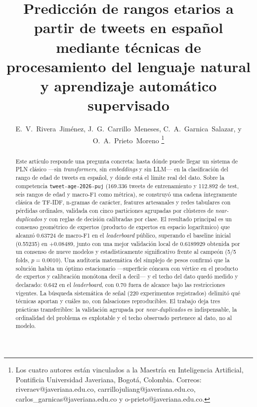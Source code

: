 \documentclass[journal]{IEEEtai}
\begin{document}
\title{Predicci\'on de rangos etarios a partir de tweets en espa\~nol mediante t\'ecnicas de procesamiento del lenguaje natural y aprendizaje autom\'atico supervisado}

\author{E.~V.~Rivera~Jim\'enez, J.~G.~Carrillo~Meneses, C.~A.~Garnica~Salazar, y O.~A.~Prieto~Moreno%
\thanks{Los cuatro autores est\'an vinculados a la Maestr\'ia en Inteligencia Artificial, Pontificia Universidad Javeriana, Bogot\'a, Colombia. Correos: riveraev@javeriana.edu.co, carrillojuliang@javeriana.edu.co, carlos\_garnicas@javeriana.edu.co y o-prieto@javeriana.edu.co.}}


\maketitle

\begin{abstract}
Este art\'iculo responde una pregunta concreta: hasta d\'onde puede llegar un sistema de PLN cl\'asico ---sin \textit{transformers}, sin \textit{embeddings} y sin LLM--- en la clasificaci\'on del rango de edad de tweets en espa\~nol, y d\'onde est\'a el l\'imite real del dato. Sobre la competencia \texttt{tweet-age-2026-puj} (169.336 tweets de entrenamiento y 112.892 de test, seis rangos de edad y macro-F1 como m\'etrica), se construy\'o una cadena \'integramente cl\'asica de TF-IDF, n-gramas de car\'acter, features artesanales y redes tabulares con p\'erdidas ordinales, validada con cinco particiones agrupadas por cl\'usteres de \textit{near-duplicados} y con reglas de decisi\'on calibradas por clase. El resultado principal es un consenso geom\'etrico de expertos (producto de expertos en espacio logar\'itmico) que alcanz\'o 0.63724 de macro-F1 en el \textit{leaderboard} p\'ublico, superando el baseline inicial (0.55235) en +0.08489, junto con una mejor validaci\'on local de 0.6189929 obtenida por un consenso de nueve modelos y estad\'isticamente significativo frente al campe\'on (5/5 folds, $p = 0.0010$). Una auditor\'ia matem\'atica del s\'implejo de pesos confirm\'o que la soluci\'on habita un \'optimo estacionario ---superficie c\'oncava con v\'ertice en el producto de expertos y calibraci\'on mon\'otona decil a decil--- y el techo del dato qued\'o medido y declarado: 0.642 en el \textit{leaderboard}, con 0.70 fuera de alcance bajo las restricciones vigentes. La b\'usqueda sistem\'atica de se\~nal (220 experimentos registrados) delimit\'o qu\'e t\'ecnicas aportan y cu\'ales no, con falsaciones reproducibles. El trabajo deja tres pr\'acticas transferibles: la validaci\'on agrupada por \textit{near-duplicados} es indispensable, la ordinalidad del problema es explotable y el techo observado pertenece al dato, no al modelo.
\end{abstract}
\end{document}
